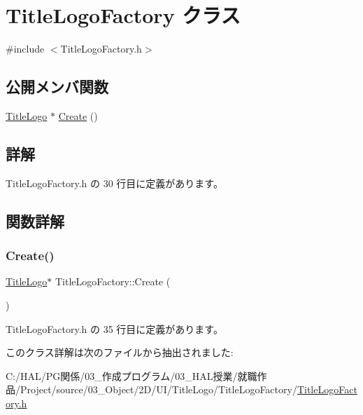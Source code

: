 \hypertarget{class_title_logo_factory}{}\section{Title\+Logo\+Factory クラス}
\label{class_title_logo_factory}


{\ttfamily \#include $<$Title\+Logo\+Factory.\+h$>$}

\subsection*{公開メンバ関数}
\begin{DoxyCompactItemize}
\item 
\mbox{\hyperlink{class_title_logo}{Title\+Logo}} $\ast$ \mbox{\hyperlink{class_title_logo_factory_acbd10f361541910e9c0cee26770f0150}{Create}} ()
\end{DoxyCompactItemize}


\subsection{詳解}


 Title\+Logo\+Factory.\+h の 30 行目に定義があります。



\subsection{関数詳解}
\mbox{\label{class_title_logo_factory_acbd10f361541910e9c0cee26770f0150}} 
\subsubsection{\texorpdfstring{Create()}{Create()}}
{\footnotesize\ttfamily \mbox{\hyperlink{class_title_logo}{Title\+Logo}}$\ast$ Title\+Logo\+Factory\+::\+Create (\begin{DoxyParamCaption}{ }\end{DoxyParamCaption})\hspace{0.3cm}{\ttfamily [inline]}}



 Title\+Logo\+Factory.\+h の 35 行目に定義があります。



このクラス詳解は次のファイルから抽出されました\+:\begin{DoxyCompactItemize}
\item 
C\+:/\+H\+A\+L/\+P\+G関係/03\+\_\+作成プログラム/03\+\_\+\+H\+A\+L授業/就職作品/\+Project/source/03\+\_\+\+Object/2\+D/\+U\+I/\+Title\+Logo/\+Title\+Logo\+Factory/\mbox{\hyperlink{_title_logo_factory_8h}{Title\+Logo\+Factory.\+h}}\end{DoxyCompactItemize}
